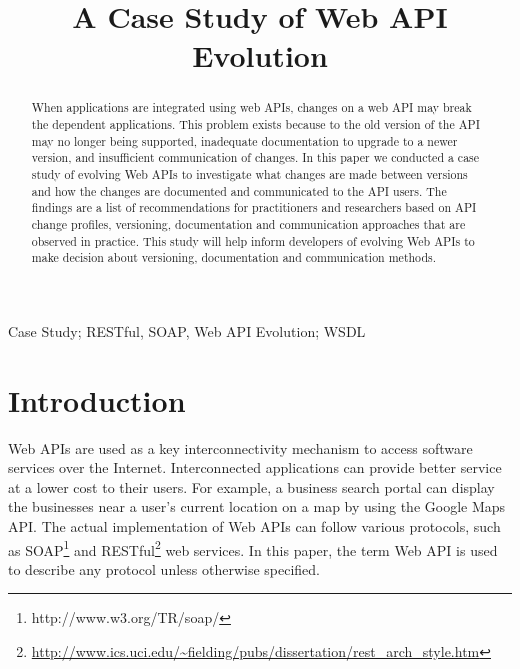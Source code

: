 \documentclass[conference]{IEEEtran}
\begin{document}
\title{A Case Study of Web API Evolution}


\author{}

\maketitle


\begin{abstract}
When applications are integrated using web APIs, changes on a web API may break the dependent applications. This problem exists because to the old version of the API may no longer being supported, inadequate documentation to upgrade to a newer version, and insufficient communication of changes. In this paper we conducted a case study of evolving Web APIs to investigate what changes are made between versions and how the changes are documented and communicated to the API users. The findings are a list of recommendations for practitioners and researchers based on API change profiles, versioning, documentation and communication approaches that are observed in practice. This study will help inform developers of evolving Web APIs to make decision about versioning, documentation and communication methods.
\end{abstract}


\begin{IEEEkeywords}
Case Study; RESTful, SOAP, Web API Evolution; WSDL
\end{IEEEkeywords}

\IEEEpeerreviewmaketitle

\section{Introduction}

Web APIs are used as a key interconnectivity mechanism to access software services over the Internet. Interconnected applications can provide better service at a lower cost to their users. For example, a business search portal can display the businesses near a user's current location on a map by using the Google Maps API. The actual implementation of Web APIs can follow various protocols, such as SOAP\footnote{http://www.w3.org/TR/soap/} and RESTful\footnote{\url{http://www.ics.uci.edu/~fielding/pubs/dissertation/rest_arch_style.htm}} web services. In this paper, the term Web API is used to describe any protocol unless otherwise specified.
\end{document}
